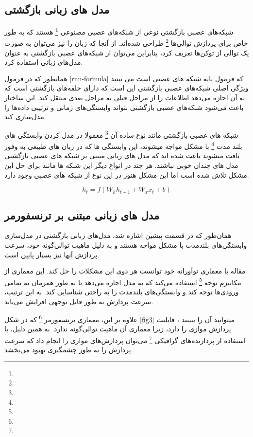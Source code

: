 \subsection{مدل های زبانی بازگشتی}
 شبکه‌های عصبی بازگشتی نوعی از شبکه‌های عصبی مصنوعی 
 \footnote{} 
 هستند که به طور خاص برای پردازش توالی‌ها 
 \footnote{}
  طراحی شده‌اند.
  \cite{b6}
   از آنجا که زبان را نیز می‌توان به صورت یک توالی از توکن‌ها تعریف کرد، بنابراین می‌توان از شبکه‌های عصبی بازگشتی به عنوان مدل‌های زبانی استفاده کرد.
  
  همانطور که در فرمول 
  \ref{rnn-formula}
  که فرمول پایه شبکه های عصبی است می بینید ویژگی اصلی شبکه‌های عصبی بازگشتی این است که دارای حلقه‌های بازگشتی است که به آن اجازه می‌دهد اطلاعات را از مراحل قبلی به مراحل بعدی منتقل کند. این ساختار باعث می‌شود شبکه‌های عصبی بازگشتی بتواند وابستگی‌های زمانی و ترتیبی داده‌ها را مدل‌سازی کند.
  
 
شبکه های عصبی بازگشتی مانند نوع ساده آن
 \footnote{}
 معمولا در مدل کردن وابستگی های بلند مدت
\footnote{}
با مشکل مواجه میشوند، این وابستگی ها که در زبان های طبیعی به وفور یافت میشوند باعث شده اند که مدل های زبانی مبتنی بر شبکه های عصبی بازگشتی مدل های چندان خوبی نباشند.
هر چند در انواع دیگر این شبکه ها مانند
\cite{b7}
 برای حل این مشکل تلاش شده است اما این مشکل هنوز در این نوع از شبکه های عصبی وجود دارد.
 
 \begin{equation*}
 	\label{rnn-formula}
 	h_t = f(W_h h_{t-1} + W_x x_t + b)
 \end{equation*}
 
\subsection{مدل های زبانی مبتنی بر ترنسفورمر}
همان‌طور که در قسمت پیشین اشاره شد، مدل‌های زبانی بازگشتی در مدل‌سازی وابستگی‌های بلندمدت با مشکل مواجه هستند و به دلیل ماهیت توالی‌گونه خود، سرعت پردازش آنها نیز بسیار پایین است.

مقاله 
\cite{b8}
 با معماری نوآورانه خود توانست هر دوی این مشکلات را حل کند. این معماری از مکانیزم توجه 
\footnote{}
 استفاده می‌کند که به مدل اجازه می‌دهد تا به طور همزمان به تمامی ورودی‌ها توجه کند و وابستگی‌های بلندمدت را به راحتی شناسایی کند. به این ترتیب، سرعت پردازش به طور قابل توجهی افزایش می‌یابد.

علاوه بر این، معماری ترنسفورمر
\footnote{}
 که در شکل
 \ref{fig3}
 میتوانید آن را ببینید
 ، قابلیت پردازش موازی را دارد، زیرا معماری آن ماهیت توالی‌گونه ندارد. به همین دلیل، با استفاده از پردازنده‌های گرافیکی
 \footnote{}
  می‌توان پردازش‌های موازی را انجام داد که سرعت پردازش را به طور چشمگیری بهبود می‌بخشد.
  
